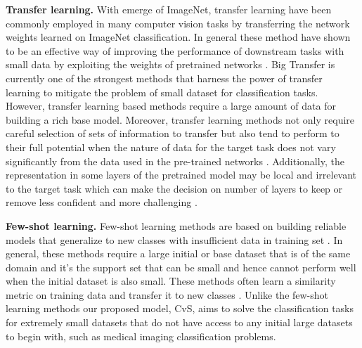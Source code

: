 \documentclass[conference]{IEEEtran}
\begin{document}
%
\textbf{Transfer learning.} With emerge of ImageNet, transfer learning have been commonly employed in many computer vision tasks by transferring the network weights learned on ImageNet classification. In general these method have shown to be an effective way of improving the performance of downstream tasks with small data by exploiting the weights of pretrained networks \cite{zhuang2020comprehensive}. Big Transfer \cite{kolesnikov2019big} is currently one of the strongest methods that harness the power of transfer learning to mitigate the problem of small dataset for classification tasks. However, transfer learning based methods require a large amount of data for building a rich base model. Moreover, transfer learning methods not only require careful selection of sets of information to transfer but also tend to perform to their full potential when the nature of data for the target task does not vary significantly from the data used in the pre-trained networks \cite{williams2020limits}. Additionally, the representation in some layers of the pretrained model may be local and irrelevant to the target task which can make the decision on number of layers to keep or remove less confident and more challenging \cite{yosinskiunderstanding}.

\textbf{Few-shot learning.} Few-shot learning methods are based on building reliable models that generalize to new classes with insufficient data in training set \cite{fei2006one, fink2004object}. In general, these methods require a large initial or base dataset that is of the same domain and it's the support set that can be small and hence cannot perform well when the initial dataset is also small. These methods often learn a similarity metric on training data and transfer it to new classes \cite{vinyals2016matching, snell2017prototypical, wu2018improving}. Unlike the few-shot learning methods our proposed model, CvS, aims to solve the classification tasks for extremely small datasets that do not have access to any initial large datasets to begin with, such as medical imaging classification problems. 
\end{document}
